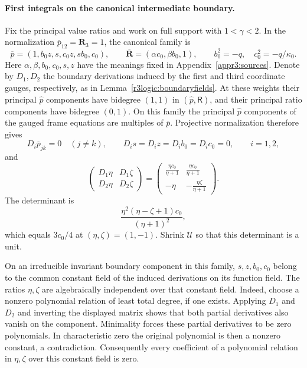 \documentclass[11pt,a4paper]{article}
\numberwithin{equation}{section}
\theoremstyle{plain}
\theoremstyle{definition}
\theoremstyle{remark}
\begin{document}
\paragraph{First integrals on the canonical intermediate boundary.}
\label{r3logic:boundaryconstants}
Fix the principal value ratios and work on full support with
$1<\gamma<2$. In the normalization
$\overline p_{12}=\overline{\boldsymbol R}_3=1$, the canonical family is
\[
 \overline p=(1,b_0z,s,c_0z,sb_0,c_0),\qquad
 \overline{\boldsymbol R}=(\alpha c_0,\beta b_0,1),\qquad
 b_0^2=-q,\quad c_0^2=-q/\kappa_0.
\]
Here $\alpha,\beta,b_0,c_0,s,z$ have the meanings fixed in
Appendix~\ref{appr3:sources}. Denote by $D_1,D_2$ the boundary
derivations induced by the first and third coordinate gauges,
respectively, as in Lemma~\ref{r3logic:boundaryfields}.
At these weights their principal $\widehat p$ components have
bidegree $(1,1)$ in $(\widehat p,\mathsf R)$, and their principal
ratio components have bidegree $(0,1)$.
On this family the principal $\widehat p$ components of the gauged
frame equations are multiples of $\overline p$.
Projective normalization therefore gives
\[
 D_i\overline p_{jk}=0\quad(j\ne k),\qquad
 D_i s=D_i z=D_i b_0=D_i c_0=0,\qquad i=1,2,
\]
and
\[
 \begin{pmatrix}
 D_1\eta&D_1\zeta\\
 D_2\eta&D_2\zeta
 \end{pmatrix}
 =
 \begin{pmatrix}
 \displaystyle\frac{\eta c_0}{\eta+1}&
 \displaystyle\frac{\eta c_0}{\eta+1}\\[4pt]
 -\eta&\displaystyle-\frac{\eta\zeta}{\eta+1}
 \end{pmatrix}.
\]
The determinant is
\[
 \frac{\eta^2(\eta-\zeta+1)c_0}{(\eta+1)^2},
\]
which equals $3c_0/4$ at $(\eta,\zeta)=(1,-1)$.
Shrink $\mathscr U$ so that this determinant is a unit.

On an irreducible invariant boundary component in this family,
$s,z,b_0,c_0$ belong to the common constant field of the induced
derivations on its function field. The ratios $\eta,\zeta$ are
algebraically independent over that constant field. Indeed, choose
a nonzero polynomial relation of least total degree, if one exists.
Applying $D_1$ and $D_2$ and inverting the displayed matrix shows
that both partial derivatives also vanish on the component.
Minimality forces these partial derivatives to be zero polynomials.
In characteristic zero the original polynomial is then a nonzero
constant, a contradiction. Consequently every coefficient of a
polynomial relation in $\eta,\zeta$ over this constant field is zero.
\end{document}
